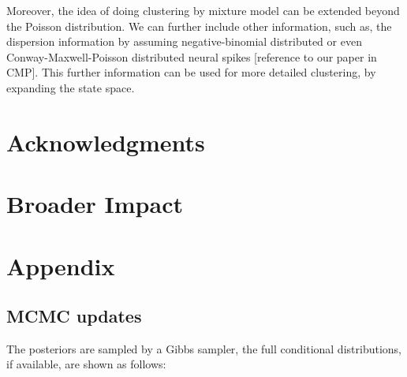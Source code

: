 \documentclass{article}
\begin{document}
	Moreover, the idea of doing clustering by mixture model can be extended beyond the Poisson distribution. We can further include other information, such as, the dispersion information by assuming negative-binomial distributed or even Conway-Maxwell-Poisson distributed neural spikes [reference to our paper in CMP]. This further information can be used for more detailed clustering, by expanding the state space.
	
	\section*{Acknowledgments}
	
	\section*{Broader Impact}
	
	\newpage
	{
		\small
		
	}
	
	
	\appendix
	
	\section{Appendix}
	
	\subsection{MCMC updates}
	The posteriors are sampled by a Gibbs sampler, the full conditional distributions, if available, are shown as follows:
	
\end{document}
